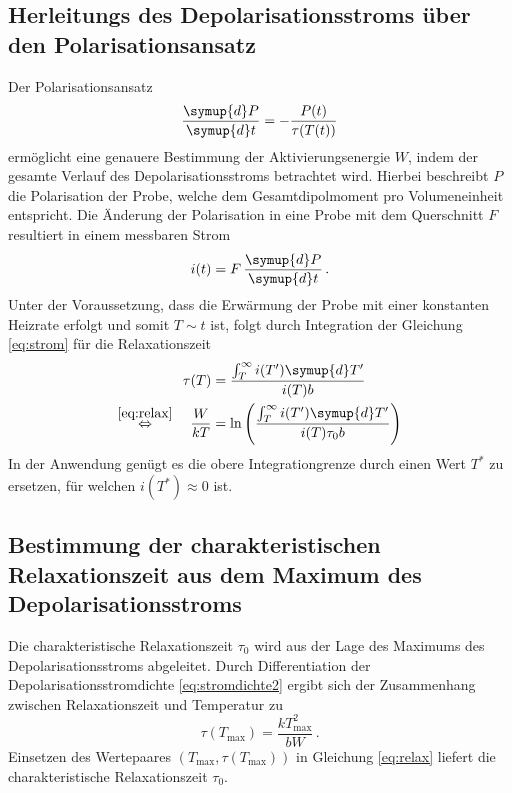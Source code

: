 \subsection*{Herleitungs des Depolarisationsstroms über den Polarisationsansatz}
Der Polarisationsansatz
\begin{equation*}
    \frac{\symup{d}P}{\symup{d}t}=-\frac{P(t)}{\tau(T(t))}
\end{equation*}
ermöglicht eine genauere Bestimmung der Aktivierungsenergie $W$, indem der gesamte Verlauf des Depolarisationsstroms betrachtet wird.
Hierbei beschreibt $P$ die Polarisation der Probe, welche dem Gesamtdipolmoment pro Volumeneinheit entspricht.
Die Änderung der Polarisation in eine Probe mit dem Querschnitt $F$ resultiert in einem messbaren Strom
\begin{equation}\label{eq:strom}
    i(t)=F\,\frac{\symup{d}P}{\symup{d}t} \, .
\end{equation}
Unter der Voraussetzung, dass die Erwärmung der Probe mit einer konstanten Heizrate erfolgt und somit $T\sim t$ ist, folgt durch Integration der Gleichung \eqref{eq:strom} für die Relaxationszeit
\begin{align}
    \tau(T)&= \frac{\int_T^\infty i(T')\symup{d}T'}{i(T)b}\\
    \stackrel{\eqref{eq:relax}}{\Leftrightarrow}\quad \frac{W}{kT} &= \ln \left(\frac{\int_T^\infty i(T')\symup{d}T'}{i(T)\tau_0 b}\right) \label{eq:integral}
\end{align}
In der Anwendung genügt es die obere Integrationgrenze durch einen Wert $T^*$ zu ersetzen, für welchen $i(T^*)\approx 0$ ist.

\subsection*{Bestimmung der charakteristischen Relaxationszeit aus dem Maximum des Depolarisationsstroms}
Die charakteristische Relaxationszeit $\tau_0$ wird aus der Lage des Maximums des Depolarisationsstroms abgeleitet.
Durch Differentiation der Depolarisationsstromdichte \eqref{eq:stromdichte2} ergibt sich der Zusammenhang zwischen Relaxationszeit und Temperatur zu
\begin{equation}
    \tau(T_\text{max})=\frac{k T_\text{max}^2}{bW} \,.
    \label{eq:tmax}
\end{equation}
Einsetzen des Wertepaares $(T_\text{max}, \tau(T_\text{max}))$ in Gleichung \eqref{eq:relax} liefert die charakteristische Relaxationszeit $\tau_0$.


